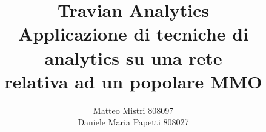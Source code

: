 \documentclass[a4paper,12pt]{report} %
\begin{document}

\title{Travian Analytics\\ \large Applicazione di tecniche di analytics su una rete \\relativa ad un popolare MMO} 
\author{Matteo Mistri 808097\\ Daniele Maria Papetti 808027}


\maketitle %
\tableofcontents %




\end{document}
